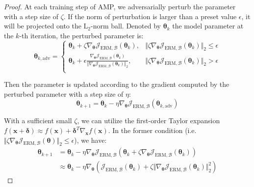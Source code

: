 \documentclass[final]{cvpr}
\begin{document}
\begin{proof}
At each training step of AMP, we adversarially perturb the parameter with a step size of $\zeta$. If the norm of perturbation is larger than a preset value $\epsilon$, it will be projected onto the $\text{L}_2$-norm ball. Denoted by $\boldsymbol{\theta}_k$ the model parameter at the $k$-th iteration, the perturbed parameter is:
\begin{equation*}
\boldsymbol{\theta}_{k,\mathrm{adv}}\!\!=\!\!\begin{cases}
\boldsymbol{\theta}_k\!+\!\zeta\nabla_{\boldsymbol{\theta}}\mathcal{J}_{\mathrm{ERM},\mathcal{B}}(\boldsymbol{\theta}_k),\!\!&\!\!\!\Vert\zeta\nabla_{\boldsymbol{\theta}}\mathcal{J}_{\mathrm{ERM},\mathcal{B}}(\boldsymbol{\theta}_k)\Vert_2\!\le\!\epsilon\\
\boldsymbol{\theta}_k\!+\!\epsilon\frac{\nabla_{\boldsymbol{\theta}}\mathcal{J}_{\mathrm{ERM},\mathcal{B}}(\boldsymbol{\theta}_k)}{\Vert\nabla_{\boldsymbol{\theta}}\mathcal{J}_{\mathrm{ERM},\mathcal{B}}(\boldsymbol{\theta}_k)\Vert_2},\!\!&\!\!\!\Vert\zeta\nabla_{\boldsymbol{\theta}}\mathcal{J}_{\mathrm{ERM},\mathcal{B}}(\boldsymbol{\theta}_k)\Vert_2\!>\!\epsilon\\
\end{cases}
\end{equation*}

Then the parameter is updated according to the gradient computed by the perturbed parameter with a step size of $\eta$:
\begin{equation*}
\boldsymbol{\theta}_{k+1}=\boldsymbol{\theta}_k-\eta\nabla_{\boldsymbol{\theta}}\mathcal{J}_{\mathrm{ERM},\mathcal{B}}(\boldsymbol{\theta}_{k,\mathrm{adv}})
\end{equation*}

With a sufficient small $\zeta$, we can utilize the first-order Taylor expansion $f(\boldsymbol{x}+\boldsymbol{\delta})\approx f(\boldsymbol{x})+\boldsymbol{\delta}^T\nabla_{\boldsymbol{x}}f(\boldsymbol{x})$. In the former condition (i.e. $\Vert\zeta\nabla_{\boldsymbol{\theta}}\mathcal{J}_{\mathrm{ERM},\mathcal{B}}(\boldsymbol{\theta})\Vert_2\le\epsilon$), we have:
\begin{align*}
\boldsymbol{\theta}_{k+1}&=\boldsymbol{\theta}_k-\eta\nabla_{\boldsymbol{\theta}}\mathcal{J}_{\mathrm{ERM},\mathcal{B}}\left(\boldsymbol{\theta}_k+\zeta\nabla_{\boldsymbol{\theta}}\mathcal{J}_{\mathrm{ERM},\mathcal{B}}(\boldsymbol{\theta}_k)\right)\nonumber\\
&\approx\boldsymbol{\theta}_k-\eta\nabla_{\boldsymbol{\theta}}\left(\mathcal{J}_{\mathrm{ERM},\mathcal{B}}(\boldsymbol{\theta}_k)+\zeta\Vert\nabla_{\boldsymbol{\theta}}\mathcal{J}_{\mathrm{ERM},\mathcal{B}}(\boldsymbol{\theta}_k)\Vert_2^2\right)
\end{align*}


\end{proof}
\end{document}
